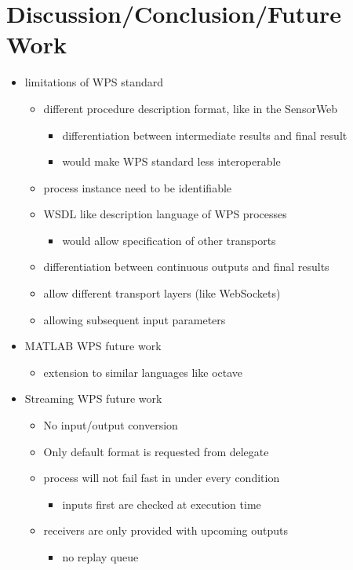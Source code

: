 \chapter{Discussion/Conclusion/Future Work}
	\begin{itemize}
		\item limitations of WPS standard
		\begin{itemize}
			\item different procedure description format, like in the SensorWeb
			\begin{itemize}
				\item differentiation between intermediate results and final result
				\item would make WPS standard less interoperable
			\end{itemize}
			\item process instance need to be identifiable
			\item WSDL like description language of WPS processes
			\begin{itemize}
				\item would allow specification of other transports
			\end{itemize}
			\item differentiation between continuous outputs and final results
			\item allow different transport layers (like WebSockets)
			\item allowing subsequent input parameters
		\end{itemize}
		\item MATLAB WPS future work
		\begin{itemize}
			\item extension to similar languages like octave
		\end{itemize}
		\item Streaming WPS future work
		\begin{itemize}
			\item No input/output conversion
			\item Only default format is requested from delegate
			\item process will not fail fast in under every condition
			\begin{itemize}
				\item inputs first are checked at execution time
			\end{itemize}
			\item receivers are only provided with upcoming outputs
			\begin{itemize}
				\item no replay queue
			\end{itemize}
		\end{itemize}
	\end{itemize}
